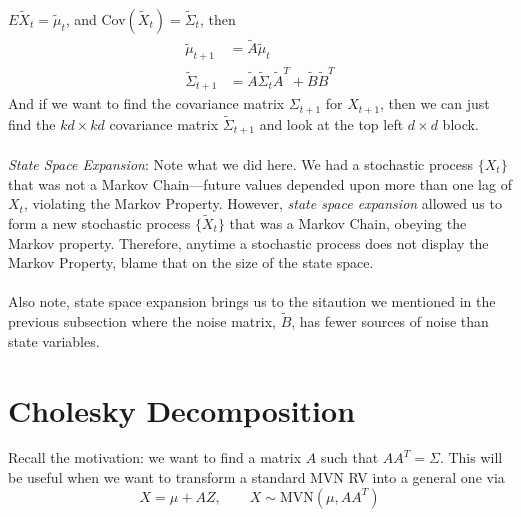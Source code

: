 \documentclass[a4paper,12pt]{scrartcl}
\begin{document}
$E\tilde{{X}}_t = \tilde{\mu}_t$, and 
Cov$(\tilde{{X}}_t) = \tilde{\Sigma}_t$, then
\begin{align*}
    \tilde{\mu}_{t+1} &= \tilde{A}\tilde{\mu}_t \\
    \tilde{\Sigma}_{t+1} &= \tilde{A} \tilde{\Sigma}_t\tilde{A}^T +
	\tilde{B} \tilde{B}^T
\end{align*}
And if we want to find the covariance matrix $\Sigma_{t+1}$ for 
${X}_{t+1}$, then we can just find the $kd \times kd$ 
covariance matrix $\tilde{\Sigma}_{t+1}$ and look at the top left 
$d\times d$ block.
\\
\\
{\sl State Space Expansion}: Note what we did here.  We had a
stochastic process $\{{X}_{t}\}$ that was not a Markov 
Chain---future values depended upon more than one lag of 
${X}_t$, violating the Markov Property.  However, 
\emph{state space expansion} allowed us to form a new stochastic
process $\{\tilde{{X}}_t\}$ that was a Markov Chain, obeying
the Markov property.  Therefore, anytime a stochastic process 
does not display the Markov Property, blame that on the size of 
the state space.
\\
\\
Also note, state space expansion brings us to the sitaution we
mentioned in the previous subsection where the noise matrix,
$\tilde{B}$, has fewer sources of noise than state variables.


\newpage
\appendix
\section{Cholesky Decomposition}

Recall the motivation: we want to find a matrix $A$ such that
$AA^T = \Sigma$. This will be useful when we want to transform
a standard MVN RV into a general one via
\begin{equation}
    {X} = \mu + A{Z}, \qquad {X}\sim 
	\text{MVN}(\mu, AA^T)
\end{equation}
\end{document}
